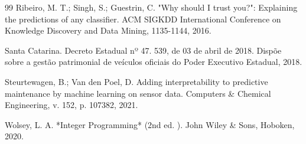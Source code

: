 \documentclass[12pt,a4paper]{article}
\begin{document}
\begin{thebibliography}{99}
 Ribeiro, M. T.; Singh, S.; Guestrin, C. "Why should I trust you?": Explaining the predictions of any classifier. ACM SIGKDD International Conference on Knowledge Discovery and Data Mining, 1135-1144, 2016.

 Santa Catarina. Decreto Estadual nº 47. 539, de 03 de abril de 2018. Dispõe sobre a gestão patrimonial de veículos oficiais do Poder Executivo Estadual, 2018.

 Steurtewagen, B.; Van den Poel, D. Adding interpretability to predictive maintenance by machine learning on sensor data. Computers \& Chemical Engineering, v. 152, p. 107382, 2021.

 Wolsey, L. A. *Integer Programming* (2nd ed. ). John Wiley \& Sons, Hoboken, 2020.

\end{thebibliography}
\end{document}
